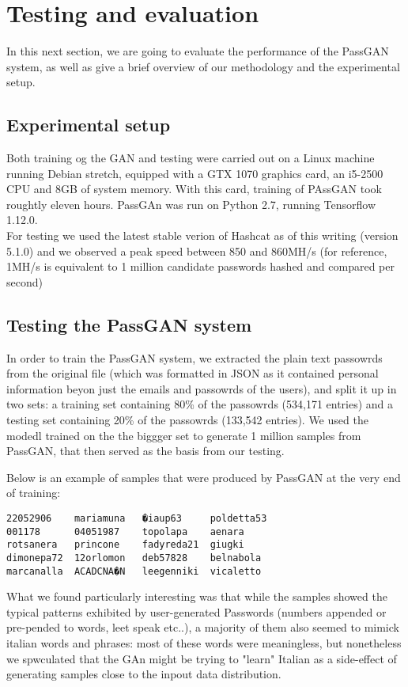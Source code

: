 \section{Testing and evaluation}
In this next section, we are going to evaluate the performance of the PassGAN system, as well as give a brief overview of our methodology and the experimental setup.

\subsection{Experimental setup}
Both training og the GAN and testing were carried out on a Linux machine running Debian stretch, equipped with a GTX 1070 graphics card, an i5-2500 CPU and 8GB of system memory. 
With this card, training of PAssGAN took roughtly eleven hours.
PassGAn was run on Python 2.7, running Tensorflow 1.12.0.\\
For testing we used the latest stable verion of Hashcat as of this writing (version 5.1.0) and we observed a peak speed between 850 and 860MH/s (for reference, 1MH/s is equivalent to 1 million candidate passwords hashed and compared per second) %

\subsection{Testing the PassGAN system}
In order to train the PassGAN system, we extracted the plain text passowrds from the original file (which was formatted in JSON as it contained personal information beyon just the emails and passowrds of the users), and split it up in two sets: a training set containing 80\% of the passowrds (534,171 entries) and a testing set containing 20\% of the passowrds (133,542 entries).
We used the modedl trained on the the biggger set to generate 1 million samples from PassGAN, that then served as the basis from our testing.

Below is an example of samples that were produced by PassGAN at the very end of training: %
\begin{verbatim}
22052906    mariamuna   �iaup63     poldetta53
001178      04051987    topolapa    aenara
rotsanera   princone    fadyreda21  giugki
dimonepa72  12orlomon   deb57828    belnabola
marcanalla  ACADCNA�N   leegenniki  vicaletto
\end{verbatim}

What we found particularly interesting was that while the samples showed the typical patterns exhibited by user-generated Passwords (numbers appended or pre-pended to words, leet speak etc..), a majority of them also seemed to mimick italian words and phrases: most of these words were meaningless, but nonetheless we spwculated that the GAn might be trying to "learn" Italian as a side-effect of generating samples close to the inpout data distribution.


